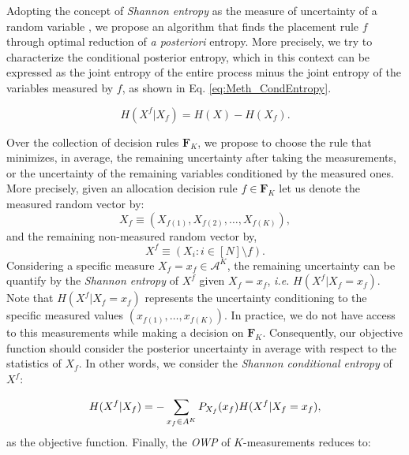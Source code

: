 Adopting the concept of \emph{Shannon entropy} as the measure of uncertainty of a random variable \cite{cover2006elements}, we propose an algorithm that finds the placement rule $f$ through optimal reduction of \emph{a posteriori} entropy. %
More precisely, we try to characterize the conditional posterior entropy, which in this context can be expressed as the joint entropy of the entire process minus the joint entropy of the variables measured by $f$, as shown in Eq. \eqref{eq:Meth_CondEntropy}.

\begin{equation}
\label{eq:Meth_CondEntropy}
	H(X^f|X_f) = H(X) - H(X_f) .
\end{equation}


Over the collection of decision rules $\mathbf{F}_K$, we propose to choose the rule that minimizes, in average, the remaining uncertainty after taking the measurements, or the uncertainty of the remaining variables conditioned by the measured ones. More precisely, given an allocation decision rule $f \in  \mathbf{F}_K$ let us denote the measured random vector by: 
\begin{equation}\label{eq:Meth_Theo_Xf}
X_{f} \equiv ( X_{f(1)},X_{f(2)}, \ldots ,X_{f(K)}) ,
\end{equation}
and the remaining non-measured random vector by, 
\begin{equation}\label{eq:Meth_Theo_Xfc}
X^f \equiv (X_{ i }: i \in [N] \setminus f ) .
\end{equation}
Considering a specific measure $X_{f} = x_{f} \in \mathcal{A}^K$, the remaining uncertainty can be quantify by the \emph{Shannon entropy} \cite{cover2006elements} of $X^f$ given $X_f  = x_{f} $, \emph{i.e.} $H(X^f|X_{f} = x_{f})$. Note that $H(X^f|X_{f} = x_{f})$ represents the uncertainty conditioning to the specific measured values $(x_{f(1)},\ldots,x_{f(K)})$. In practice, we do not have access to this measurements while making a decision on $\mathbf{F}_K$. Consequently, our objective function should consider the posterior uncertainty in average with respect to the statistics of $X_{f}$. In other words, we consider the \emph{Shannon conditional entropy} \cite{cover2006elements} of $X^f$: %

\begin{equation} \label{eq:Meth_Theo_Hc}
\footnotesize{
H(X^f|X_{f}) =  -\displaystyle\sum_{x_{f} \in A^K} P_{X_{f}}(x_{f}) H(X^f|X_{f}=x_{f}) ,
}
\end{equation}
as the objective function. Finally, the \emph{OWP} of $K$-measurements reduces to:

